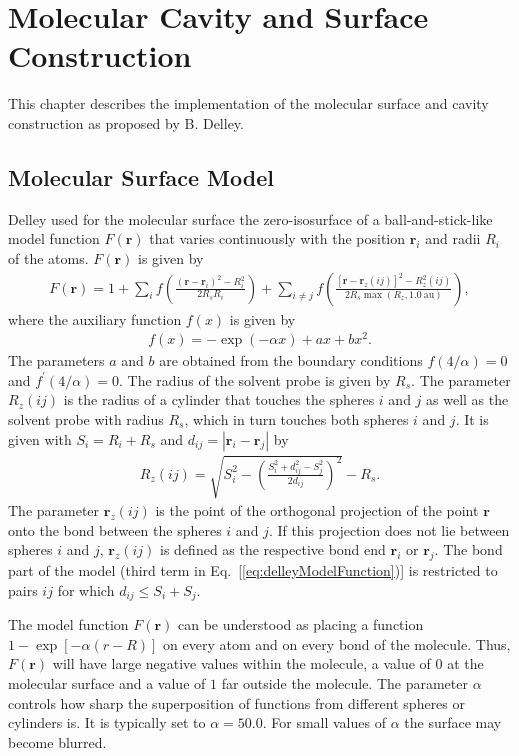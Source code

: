 \section{Molecular Cavity and Surface Construction\label{sec:MolcSurface}}
This chapter describes the implementation of the molecular surface and cavity construction as
proposed by B. Delley\cite{Delley2006}.

\subsection{Molecular Surface Model}
Delley used for the molecular surface the zero-isosurface of a ball-and-stick-like
model function $F(\pmb{r})$ that varies continuously with the position $\pmb{r}_i$
and radii $R_i$ of the atoms. $F(\pmb{r})$ is given by
\begin{align}
  F(\pmb{r}) = 1+\sum_i f\left(\frac{(\pmb{r}-\pmb{r}_i)^2-R_i^2}{2R_sR_i} \right)
                +\sum_{i\neq j} f\left( \frac{\left[\pmb{r}-\pmb{r}_z(ij)\right]^2-R_z^2(ij)}{2R_s \max(R_z, 1.0~\text{au})} \right),
  \label{eq:delleyModelFunction}
\end{align}
where the auxiliary function $f(x)$ is given by
\begin{align}
  f(x) = -\exp(-\alpha x) + ax + b x^2.
\end{align}
The parameters $a$ and $b$ are obtained from the boundary conditions
$f(4/\alpha) = 0$ and $f^\prime(4/\alpha) = 0$. The radius of the solvent
probe is given by $R_s$. The parameter $R_z(ij)$ is the radius of a cylinder
that touches the spheres $i$ and $j$ as well as the solvent probe with radius
$R_s$, which in turn touches both spheres $i$ and $j$. It is given
with $S_i = R_i + R_s$ and $d_{ij} = |\pmb{r}_i-\pmb{r}_j|$ by
\begin{align}
  R_z(ij) = \sqrt{S_i^2 - \left( \frac{S_i^2+d_{ij}^2-S_j^2}{2d_{ij}} \right)^2}-R_s.
\end{align}
The parameter $\pmb{r}_z(ij)$ is the point of the orthogonal projection of the
point $\pmb{r}$ onto the bond between the spheres $i$ and $j$. If this projection
does not lie between spheres $i$ and $j$, $\pmb{r}_z(ij)$ is defined as the respective
bond end $\pmb{r}_i$ or $\pmb{r}_j$.
The bond part of the model (third term in Eq.~[\ref{eq:delleyModelFunction})] is restricted
to pairs $ij$ for which $d_{ij} \leq S_i+S_j$.


The model function $F(\pmb{r})$ can be understood as placing a function
$1-\exp\left[-\alpha (r-R)\right]$ on every atom and on every bond of the molecule.
Thus, $F(\pmb{r})$ will have large negative values within the molecule, a value of
$0$ at the molecular surface and a value of $1$ far outside the molecule. The parameter
$\alpha$ controls how sharp the superposition of functions from different spheres or
cylinders is. It is typically set to $\alpha = 50.0$. For small values of $\alpha$ the
surface may become blurred.

